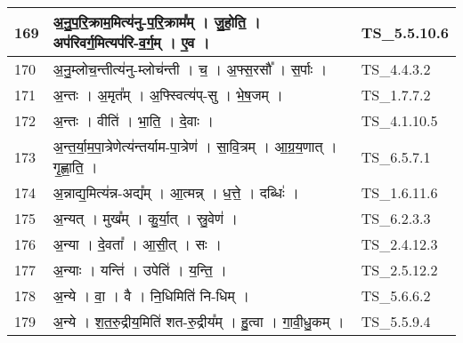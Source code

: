 \documentclass[17pt]{extarticle}
\begin{document}
\begin{longtable}{||p{0.4in}||p{4.9in}||p{0.9in}||}
    169 & अ॒नु॒प॒रि॒क्राम॒मित्य॑नु{-}प॒रि॒क्राम᳚म्   ।   जु॒हो॒ति॒   ।   अप॑रिवर्ग॒मित्यप॑रि{-}व॒र्ग॒म्   ।   ए॒व   ।    & TS\_5.5.10.6       \\
    
    \hline
        
    170 & अ॒नु॒म्लोच॒न्तीत्य॑नु{-}म्लोच॑न्ती   ।   च॒   ।   अ॒फ्स॒रसौ᳚   ।   स॒र्पाः   ।    & TS\_4.4.3.2       \\
    
    \hline
        
    171 & अ॒न्तः   ।   अ॒मृत᳚म्   ।   अ॒फ्स्वित्य॑प्{-}सु   ।   भे॒ष॒जम्   ।    & TS\_1.7.7.2       \\
    
    \hline
        
    172 & अ॒न्तः   ।   वीति॑   ।   भा॒ति॒   ।   दे॒वाः   ।    & TS\_4.1.10.5       \\
    
    \hline
        
    173 & अ॒न्त॒र्या॒म॒पा॒त्रेणेत्य॑न्तर्याम{-}पा॒त्रेण॑   ।   सा॒वि॒त्रम्   ।   आ॒ग्र॒य॒णात्   ।   गृ॒ह्णा॒ति॒   ।    & TS\_6.5.7.1       \\
    
    \hline
        
    174 & अ॒न्नाद्य॒मित्य॑न्न{-}अद्य᳚म्   ।   आ॒त्मन्न्   ।   ध॒त्ते॒   ।   दब्धिः॑   ।    & TS\_1.6.11.6       \\
    
    \hline
        
    175 & अ॒न्यत्   ।   मुख᳚म्   ।   कु॒र्या॒त्   ।   स्रु॒वेण॑   ।    & TS\_6.2.3.3       \\
    
    \hline
        
    176 & अ॒न्या   ।   दे॒वता᳚   ।   आ॒सी॒त्   ।   सः   ।    & TS\_2.4.12.3       \\
    
    \hline
        
    177 & अ॒न्याः   ।   यन्ति॑   ।   उपेति॑   ।   य॒न्ति॒   ।    & TS\_2.5.12.2       \\
    
    \hline
        
    178 & अ॒न्ये   ।   वा॒   ।   वै   ।   नि॒धिमिति॑ नि{-}धिम्   ।    & TS\_5.6.6.2       \\
    
    \hline
        
    179 & अ॒न्ये   ।   श॒त॒रु॒द्रीय॒मिति॑ शत{-}रु॒द्रीय᳚म्   ।   हु॒त्वा   ।   गा॒वी॒धु॒कम्   ।    & TS\_5.5.9.4       \\
    

\end{longtable}
\end{document}
